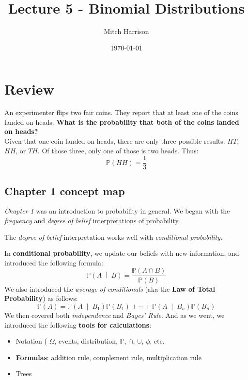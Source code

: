 \documentclass[titlepage, 12pt, leqno]{article}
\title{\Huge{Lecture 5 - Binomial Distributions}}
\author{\large{Mitch Harrison}}
\date{\today}
\begin{document}
\setlength{\parskip}{1\baselineskip}
\setlength{\parindent}{15pt}
\maketitle
\tableofcontents
\newpage


\section{Review}
\begin{ex}
    An experimenter flips two fair coins. They report that at least one of the coins landed on heads. \textbf{What is the probability that both of the coins landed on heads?}\\[.1in]
    Given that one coin landed on heads, there are only three possible results: $HT$, $HH$, or $TH$. Of those three, only one of those is two heads. Thus:
    \[
    \boxed{\mathbb{P}(HH) = \frac{1}{3}}
    \]
\end{ex}

\subsection{Chapter 1 concept map}
\textit{Chapter 1} was an introduction to probability in general. We began with the \textit{frequency} and \textit{degree of belief} interpretations of probability. 

The \textit{degree of belief} interpretation works well with \textit{conditional probability.} 

In \textbf{conditional probability}, we update our beliefs with new information, and introduced the following formula:
\[
\mathbb{P}\left(A \;\middle|\; B\right) = \frac{\mathbb{P}(A \cap B)}{\mathbb{P}(B)} 
\]
We also introduced the \textit{average of conditionals} (aka the \textbf{Law of Total Probability}) as follows:
\[
\mathbb{P}(A) = \mathbb{P}\left(A \;\middle|\; B_1\right) \mathbb{P}(B_1) + \cdots + \mathbb{P}\left(A \;\middle|\; B_n\right)\mathbb{P}(B_n)
\]
We then covered both \textit{independence} and \textit{Bayes' Rule}. And as we went, we introduced the following \textbf{tools for calculations}:
\begin{itemize}
    \item Notation ( $\Omega$, events, distribution, $\mathbb{P}$, $\cap$, $\cup $, $\phi $, etc.
    \item \textbf{Formulas}: addition rule, complement rule, multiplication rule
    \item Trees
\end{itemize}
\end{document}
